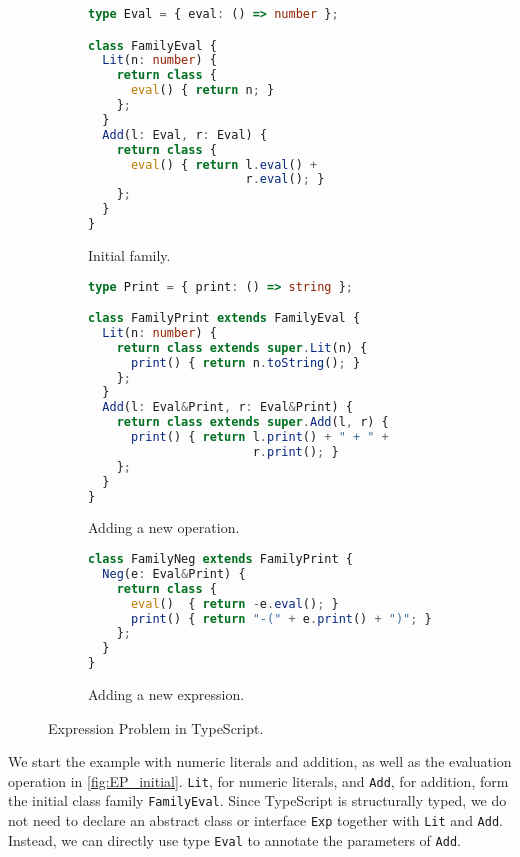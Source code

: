 \begin{figure}[t]
\begin{subfigure}{.5\textwidth}
\begin{lstlisting}[language=TypeScript,basicstyle=\ttfamily\footnotesize]
type Eval = { eval: () => number };

class FamilyEval {
  Lit(n: number) {
    return class {
      eval() { return n; }
    };
  }
  Add(l: Eval, r: Eval) {
    return class {
      eval() { return l.eval() +
                      r.eval(); }
    };
  }
}
\end{lstlisting}
\caption{Initial family.}\label{fig:EP_initial}
\end{subfigure}%
\begin{subfigure}{.5\textwidth}
\begin{lstlisting}[language=TypeScript,basicstyle=\ttfamily\footnotesize]
type Print = { print: () => string };

class FamilyPrint extends FamilyEval {
  Lit(n: number) {
    return class extends super.Lit(n) {
      print() { return n.toString(); }
    };
  }
  Add(l: Eval&Print, r: Eval&Print) {
    return class extends super.Add(l, r) {
      print() { return l.print() + " + " +
                       r.print(); }
    };
  }
}
\end{lstlisting}
\caption{Adding a new operation.}\label{fig:EP_operation}
\end{subfigure}
\par\bigskip
\begin{subfigure}{\textwidth}
\begin{lstlisting}[language=TypeScript,xleftmargin=.25\textwidth,basicstyle=\ttfamily\footnotesize]
class FamilyNeg extends FamilyPrint {
  Neg(e: Eval&Print) {
    return class {
      eval()  { return -e.eval(); }
      print() { return "-(" + e.print() + ")"; }
    };
  }
}
\end{lstlisting}
\caption{Adding a new expression.}\label{fig:EP_expression}
\end{subfigure}
\caption{Expression Problem in TypeScript.}
\end{figure}

We start the example with numeric literals and addition, as well as the
evaluation operation in \autoref{fig:EP_initial}. \lstinline{Lit}, for numeric
literals, and \lstinline{Add}, for addition, form the initial class family
\lstinline{FamilyEval}. Since TypeScript is structurally typed, we do not need
to declare an abstract class or interface \lstinline{Exp} together with
\lstinline{Lit} and \lstinline{Add}. Instead, we can directly use type
\lstinline{Eval} to annotate the parameters of \lstinline{Add}.

